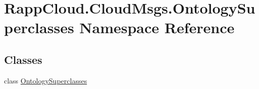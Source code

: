 \hypertarget{namespaceRappCloud_1_1CloudMsgs_1_1OntologySuperclasses}{\section{Rapp\-Cloud.\-Cloud\-Msgs.\-Ontology\-Superclasses Namespace Reference}
\label{namespaceRappCloud_1_1CloudMsgs_1_1OntologySuperclasses}
}
\subsection*{Classes}
\begin{DoxyCompactItemize}
\item 
class \hyperlink{classRappCloud_1_1CloudMsgs_1_1OntologySuperclasses_1_1OntologySuperclasses}{Ontology\-Superclasses}
\end{DoxyCompactItemize}
